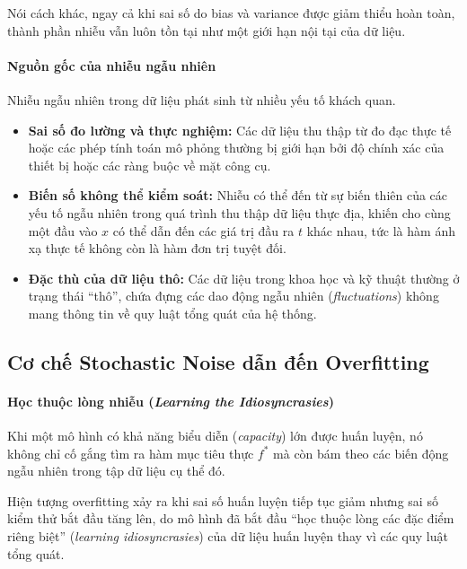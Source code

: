 Nói cách khác, ngay cả khi sai số do bias và variance được giảm thiểu hoàn toàn, thành phần nhiễu vẫn luôn tồn tại như một giới hạn nội tại của dữ liệu.

\paragraph{Nguồn gốc của nhiễu ngẫu nhiên} 

Nhiễu ngẫu nhiên trong dữ liệu phát sinh từ nhiều yếu tố khách quan.

\begin{itemize}
    \item \textbf{Sai số đo lường và thực nghiệm:} Các dữ liệu thu thập từ đo đạc thực tế hoặc các phép tính toán mô phỏng thường bị giới hạn bởi độ chính xác của thiết bị hoặc các ràng buộc về mặt công cụ.

    \item \textbf{Biến số không thể kiểm soát:} Nhiễu có thể đến từ sự biến thiên của các yếu tố ngẫu nhiên trong quá trình thu thập dữ liệu thực địa, khiến cho cùng một đầu vào $x$ có thể dẫn đến các giá trị đầu ra $t$ khác nhau, tức là hàm ánh xạ thực tế không còn là hàm đơn trị tuyệt đối.

    \item \textbf{Đặc thù của dữ liệu thô:} Các dữ liệu trong khoa học và kỹ thuật thường ở trạng thái ``thô'', chứa đựng các dao động ngẫu nhiên (\textit{fluctuations}) không mang thông tin về quy luật tổng quát của hệ thống.
\end{itemize}
\subsection{Cơ chế Stochastic Noise dẫn đến Overfitting}

\paragraph{Học thuộc lòng nhiễu (\textit{Learning the Idiosyncrasies})}

Khi một mô hình có khả năng biểu diễn (\textit{capacity}) lớn được huấn luyện, nó không chỉ cố gắng tìm ra hàm mục tiêu thực $f^{*}$ mà còn bám theo các biến động ngẫu nhiên trong tập dữ liệu cụ thể đó.

Hiện tượng overfitting xảy ra khi sai số huấn luyện tiếp tục giảm nhưng sai số kiểm thử bắt đầu tăng lên, do mô hình đã bắt đầu ``học thuộc lòng các đặc điểm riêng biệt'' (\textit{learning idiosyncrasies}) \cite{keskar2017largebatchtrainingdeeplearning} của dữ liệu huấn luyện thay vì các quy luật tổng quát.

